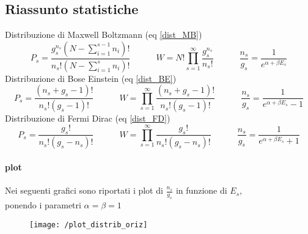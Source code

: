 \subsection{Riassunto statistiche}
Distribuzione di Maxwell Boltzmann (eq \ref{dist_MB})
\begin{equation}
P_s = \frac{g_s^{n_s}(N- \sum_{i=1}^{s-1}n_i )!}{n_s! ( N - \sum_{i=1}^{s}n_i )!}  
\quad\quad\quad  
W = N! \prod_{s=1}^{\infty}\frac{ g_s^{n_s}}{ n_s!}
\quad\quad\quad  
\frac{ n_s}{g_s } = \frac{ 1}{e^{ \alpha + \beta E_s } }
\end{equation}
Distribuzione di Bose Einstein (eq \ref{dist_BE})
\begin{equation}
P_s = \frac{ (n_s + g_s - 1)!}{n_s! (g_s - 1)! }  
\quad\quad\quad 
W =  \prod_{s=1}^{ \infty } \frac{ (n_s + g_s - 1)!}{n_s! (g_s - 1)! }
\quad\quad\quad
\frac{ n_s}{g_s } = \frac{ 1}{e^{ \alpha + \beta E_s } - 1 }
\end{equation}
Distribuzione di Fermi Dirac (eq \ref{dist_FD})
\begin{equation}
P_s = \frac{ g_s !}{n_s! (g_s - n_s)! }
\quad\quad\quad
W = \prod_{s=1}^{\infty} \frac{ g_s !}{n_s! (g_s - n_s)! }
\quad\quad\quad
\frac{ n_s}{g_s } = \frac{ 1}{e^{ \alpha + \beta E_s } + 1 }
\end{equation}

\paragraph{plot}
Nei seguenti grafici sono riportati i plot di $\frac{ n_s}{g_s }$ in funzione di $E_s$, \\
ponendo i parametri $\alpha=\beta=1$
\begin{figure}[h]
\centering
\texttt{[image: /plot\_distrib\_oriz]}
\end{figure}


